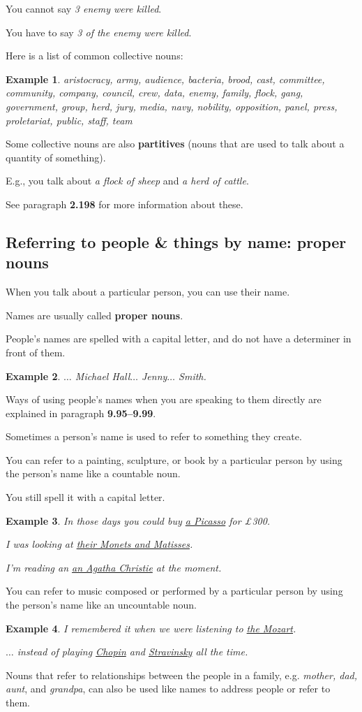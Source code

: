 \documentclass[oneside]{book}
\numberwithin{equation}{section}
\newtheorem{example}{Example}[section]
\begin{document}
You cannot say \textit{3 enemy were killed}.

You have to say \textit{3 of the enemy were killed}.

%
\noindent{} Here is a list of common collective nouns:
\begin{example}
    aristocracy, army, audience, bacteria, brood, cast, committee, community, company, council, crew, data, enemy, family, flock, gang, government, group, herd, jury, media, navy, nobility, opposition, panel, press, proletariat, public, staff, team
\end{example}
Some collective nouns are also \textbf{partitives} (nouns that are used to talk about a quantity of something).

E.g., you talk about \textit{a flock of sheep} and \textit{a herd of cattle}.

See paragraph \textbf{2.198} for more information about these.

\subsection{Referring to people \& things by name: proper nouns}
\noindent{} When you talk about a particular person, you can use their name.

Names are usually called \textbf{proper nouns}.

%
People's names are spelled with a capital letter, and do not have a determiner in front of them.
\begin{example}
    $\ldots$ Michael Hall$\ldots$ Jenny$\ldots$ Smith.
\end{example}
Ways of using people's names when you are speaking to them directly are explained in paragraph \textbf{9.95--9.99}.

%
\noindent{} Sometimes a person's name is used to refer to something they create.

You can refer to a painting, sculpture, or book by a particular person by using the person's name like a countable noun.

You still spell it with a capital letter.
\begin{example}
    In those days you could buy \underline{a Picasso} for \pounds300.
    
    I was looking at \underline{their Monets and Matisses}.
    
    I'm reading an \underline{an Agatha Christie} at the moment.
\end{example}
You can refer to music composed or performed by a particular person by using the person's name like an uncountable noun.
\begin{example}
    I remembered it when we were listening to \underline{the Mozart}.
    
    $\ldots$ instead of playing \underline{Chopin} and \underline{Stravinsky} all the time.
\end{example}
%
\noindent{} Nouns that refer to relationships between the people in a family, e.g. \textit{mother, dad, aunt}, and \textit{grandpa}, can also be used like names to address people or refer to them.
\end{document}
